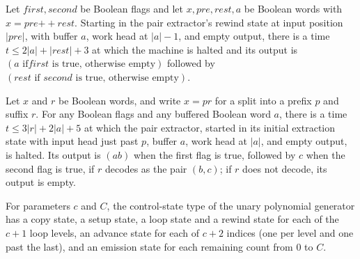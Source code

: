 \begin{lemma}
\label{Turing.FinTM.extract_finish}
\leanok
{}
Let $first,second$ be Boolean flags and let $x,pre,rest,a$ be Boolean words with
$x=pre\mathbin{++}rest$. Starting in the pair extractor's rewind state at input position
$|pre|$, with buffer $a$, work head at $|a|-1$, and empty output, there is a time $t\le
2|a|+|rest|+3$ at which the machine is halted and its output is $(a\text{ if
}first\text{ is true, otherwise empty})$ followed by $(rest\text{ if }second\text{ is
true, otherwise empty})$.
\end{lemma}

\begin{lemma}
\label{Turing.FinTM.extract_run}
\leanok
{}
Let $x$ and $r$ be Boolean words, and write $x=p r$ for a split into a prefix $p$ and
suffix $r$. For any Boolean flags and any buffered Boolean word $a$, there is a time $t
\le 3|r|+2|a|+5$ at which the pair extractor, started in its initial extraction state
with input head just past $p$, buffer $a$, work head at $|a|$, and empty output, is
halted. Its output is $(a b)$ when the first flag is true, followed by $c$ when the
second flag is true, if $r$ decodes as the pair $(b,c)$; if $r$ does not decode, its
output is empty.
\end{lemma}

\begin{definition}
\label{Turing.FinTM.CatalogPolyControl}
\leanok
For parameters $c$ and $C$, the control-state type of the unary polynomial
generator has a copy state, a setup state, a loop state and a rewind state
for each of the $c+1$ loop levels, an advance state for each of $c+2$
indices (one per level and one past the last), and an emission state for
each remaining count from $0$ to $C$.
\end{definition}

